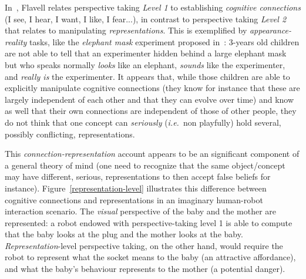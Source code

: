 \documentclass{sig-alternate}
\newcommand{\ie}{{\textit{i.e.~}}}
\begin{document}
In~\cite{flavell1990developmental}, Flavell relates perspective taking
\emph{Level 1} to establishing \emph{cognitive connections} (I see, I hear, I
want, I like, I fear...), in contrast to perspective taking \emph{Level 2} that
relates to manipulating \emph{representations}.  This is exemplified by
\emph{appearance-reality} tasks, like the \emph{elephant mask} experiment
proposed in~\cite{flavell1990developmental}: 3-years old children are not able
to tell that an experimenter hidden behind a large elephant mask but who speaks
normally \emph{looks} like an elephant, \emph{sounds} like the experimenter, and
\emph{really is} the experimenter.  It appears that, while those children are
able to explicitly manipulate cognitive connections (they know for instance that
these are largely independent of each other and that they can evolve over time)
and know as well that their own connections are independent of those of other
people, they do not think that one concept can \emph{seriously} (\ie non
playfully) hold several, possibly conflicting, representations.

This \emph{connection-representation} account appears to be an significant
component of a general theory of mind (one need to recognize that the same
object/concept may have different, serious, representations to then accept false
beliefs for instance). Figure~\ref{representation-level} illustrates this
difference between cognitive connections and representations in an imaginary
human-robot interaction scenario. The \emph{visual} perspective of the baby and
the mother are represented: a robot endowed with perspective-taking level 1 is
able to compute that the baby looks at the plug and the mother looks at the
baby.  \emph{Representation}-level perspective taking, on the other hand, would
require the robot to represent what the socket means to the baby (an attractive
affordance), and what the baby's behaviour represents to the mother (a potential
danger).


\end{document}
